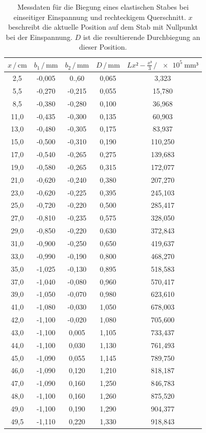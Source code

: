 \begin{table}
\centering
\caption{Messdaten für die Biegung eines elastischen Stabes bei einseitiger Einspannung und 
rechteckigem Querschnitt. $x$ beschreibt die aktuelle Position auf dem Stab mit Nullpunkt bei
der Einspannung. $D$ ist die resultierende Durchbiegung an dieser Position.}
\label{tab:Messdaten1}
\begin{tabular}{c c c c c}
\toprule
$x \,/\, \si{\centi\meter}$ & $b_1 \,/\, \si{\milli\meter}$ & 
$b_2 \,/\, \si{\milli\meter}$ & $D \,/\, \si{\milli\meter}$ &
$Lx²-\frac{x³}{3} \,/\, \SI{e5}{\milli\meter³}$\\
\midrule
 2,5 & -0,005 & 0.,60  & 0,065 &   3,323\\
 5,5 & -0,270 & -0,215 & 0,055 &  15,780\\
 8,5 & -0,380 & -0,280 & 0,100 &  36,968\\
11,0 & -0,435 & -0,300 & 0,135 &  60,903\\
13,0 & -0,480 & -0,305 & 0,175 &  83,937\\
15,0 & -0,500 & -0,310 & 0,190 & 110,250\\
17,0 & -0,540 & -0,265 & 0,275 & 139,683\\
19,0 & -0,580 & -0,265 & 0,315 & 172,077\\
21,0 & -0,620 & -0,240 & 0,380 & 207,270\\
23,0 & -0,620 & -0,225 & 0,395 & 245,103\\
25,0 & -0,720 & -0,220 & 0,500 & 285,417\\
27,0 & -0,810 & -0,235 & 0,575 & 328,050\\
29,0 & -0,850 & -0,220 & 0,630 & 372,843\\
31,0 & -0,900 & -0,250 & 0,650 & 419,637\\
33,0 & -0,990 & -0,190 & 0,800 & 468,270\\
35,0 & -1,025 & -0,130 & 0,895 & 518,583\\
37,0 & -1,040 & -0,080 & 0,960 & 570,417\\
39,0 & -1,050 & -0,070 & 0,980 & 623,610\\
41,0 & -1,080 & -0,030 & 1,050 & 678,003\\
42,0 & -1,100 & -0,020 & 1,080 & 705,600\\
43,0 & -1,100 &  0,005 & 1,105 & 733,437\\
44,0 & -1,100 &  0,030 & 1,130 & 761,493\\
45,0 & -1,090 &  0,055 & 1,145 & 789,750\\
46,0 & -1,090 &  0,120 & 1,210 & 818,187\\
47,0 & -1,090 &  0,160 & 1,250 & 846,783\\
48,0 & -1,100 &  0,160 & 1,260 & 875,520\\
49,0 & -1,100 &  0,190 & 1,290 & 904,377\\
49,5 & -1,110 &  0,220 & 1,330 & 918,843\\
\bottomrule
\end{tabular}
\end{table}

